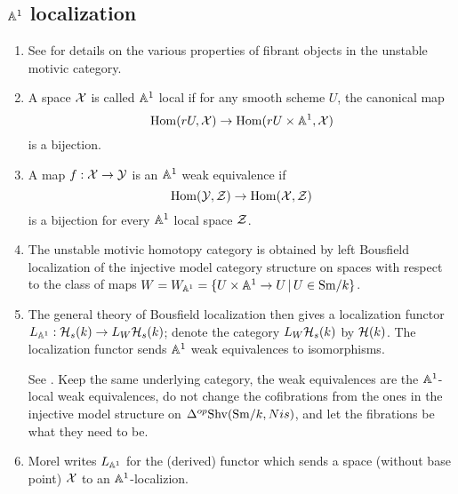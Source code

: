 \documentclass{amsart}%
\begin{document}
\subsection{$\mathbb{A}^1$ localization}
\begin{enumerate}
    \item See \cite[Prop 2.3.3.]{Pelaez} for details on the various properties
of fibrant objects in the unstable motivic category.


\item 

\begin{definition} A space $\mathcal{X}$ is called $\mathbb{A}^1$ local if for any
  smooth scheme $U$, the canonical map
  \begin{equation*}
    \operatorname{Hom}(rU, \mathcal{X}) \to \operatorname{Hom}(rU\times \mathbb{A}^1, \mathcal{X})
  \end{equation*}
  is a bijection. 
\end{definition}

  \item 

\begin{definition}
  A map $f: \mathcal{X} \to \mathcal{Y}$ is an $\mathbb{A}^1$ weak equivalence if 
  \begin{equation*}
    \operatorname{Hom}(\mathcal{Y}, \mathcal{Z}) \to \operatorname{Hom}(\mathcal{X}, \mathcal{Z})
  \end{equation*}
  is a bijection for every $\mathbb{A}^1$ local space $\mathcal{Z}$.
\end{definition}

  \item The unstable motivic homotopy category is obtained by left
Bousfield localization of the injective model category structure on
spaces with respect to the class of maps
$W = W_{\mathbb{A}^1} = \{ U \times \mathbb{A}^1 \to U \, \vert \, U \in \mathrm{Sm}/k\}$.

  \item The general theory of Bousfield localization then gives a
localization functor $L_{\mathbb{A}^1} : \mathcal{H}_s(k) \to L_{W}\mathcal{H}_s(k)$;
denote the category $L_{W}\mathcal{H}_s(k)$ by $\mathcal{H}(k)$. The localization
functor sends $\mathbb{A}^1$ weak equivalences to isomorphisms. 

See \cite[Definition 3.3.1]{Hir}. Keep the same underlying category,
the weak equivalences are the $\mathbb{A}^1$-local weak equivalences, do not
change the cofibrations from the ones in the injective model
structure on $\Delta^{op}\mathrm{Shv}(\mathrm{Sm}/k,Nis)$, and let the fibrations be
what they need to be. 

  \item Morel writes $L_{\mathbb{A}^1}$ for the (derived) functor which
sends a space (without base point) $\mathcal{X}$ to an $\mathbb{A}^1$-localizion. 


\end{enumerate}
\end{document}
